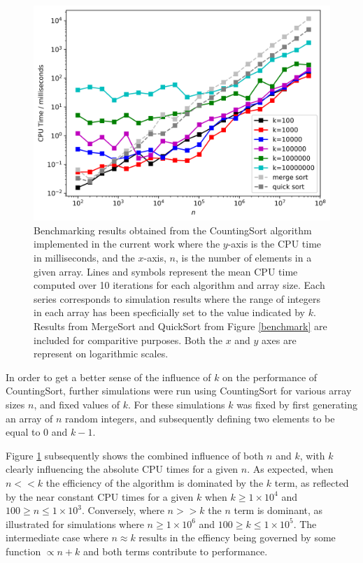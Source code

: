 \documentclass[12pt,a4paper]{article}
\begin{document}
\begin{figure}[t!]
\includegraphics[scale=0.85]{counting_sort_n_k_data_log_log.png} 
\caption{Benchmarking results obtained from the CountingSort algorithm implemented in the current work where the $y$-axis is the CPU time in milliseconds, and the $x$-axis, $n$, is the number of elements in a given array. Lines and symbols represent the mean CPU time computed over 10 iterations for each algorithm and array size. Each series corresponds to simulation results where the range of integers in each array has been specficially set to the value indicated by $k$. Results from MergeSort and QuickSort from Figure \ref{benchmark} are included for comparitive purposes. Both the $x$ and $y$ axes are represent on logarithmic scales.}
\label{benchmark2}
\end{figure}


In order to get a better sense of the influence of $k$ on the performance of CountingSort, further simulations were run using CountingSort for various array sizes $n$, and fixed values of $k$. For these simulations $k$ was fixed by first generating an array of $n$ random integers, and subsequently defining two elements to be equal to 0 and $k-1$. 

Figure \ref{benchmark2} subsequently shows the combined influence of both $n$ and $k$, with $k$ clearly influencing the absolute CPU times for a given $n$. As expected, when $n<<k$ the efficiency of the algorithm is dominated by the $k$ term, as reflected by the near constant CPU times for a given $k$ when $k \geq 1\times10^4$ and $100 \geq n \leq 1\times10^3$. Conversely, where $n>>k$ the $n$ term is dominant, as illustrated for simulations where $n \geq 1\times10^6$ and $100 \geq k \leq 1\times10^5$. The intermediate case where $n\approx k$ results in the effiency being governed by some function $\propto n+k$ and both terms contribute to performance.
\end{document}
